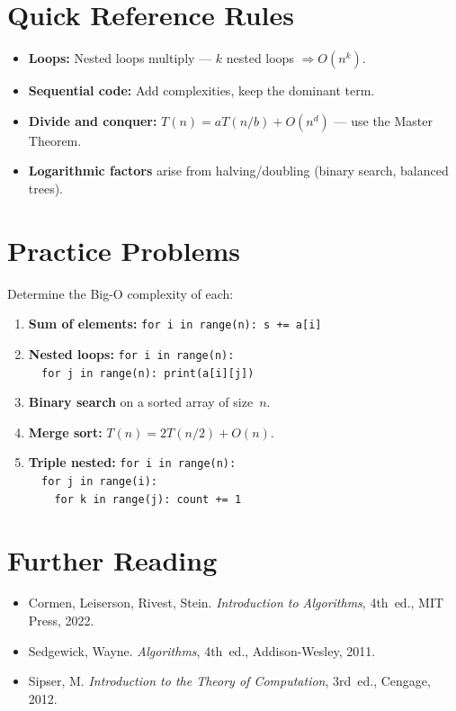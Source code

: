 \documentclass[
    language=english,
    doctype=handout,
    institution=none,
]{../../omnilatex}
\begin{document}

\section{Quick Reference Rules}

\begin{itemize}
    \item \textbf{Loops:} Nested loops multiply --- $k$ nested loops $\Rightarrow O(n^k)$.
    \item \textbf{Sequential code:} Add complexities, keep the dominant term.
    \item \textbf{Divide and conquer:} $T(n) = aT(n/b) + O(n^d)$ --- use the Master Theorem.
    \item \textbf{Logarithmic factors} arise from halving/doubling (binary search, balanced trees).
\end{itemize}

\section{Practice Problems}

Determine the Big-O complexity of each:

\begin{enumerate}
    \item \textbf{Sum of elements:}
          \texttt{for i in range(n): s += a[i]}
    \item \textbf{Nested loops:}
          \texttt{for i in range(n):}\\
          \texttt{\ \ for j in range(n): print(a[i][j])}
    \item \textbf{Binary search} on a sorted array of size~$n$.
    \item \textbf{Merge sort:}
          $T(n) = 2T(n/2) + O(n)$.
    \item \textbf{Triple nested:}
          \texttt{for i in range(n):}\\
          \texttt{\ \ for j in range(i):}\\
          \texttt{\ \ \ \ for k in range(j): count += 1}
\end{enumerate}

\section{Further Reading}

\begin{itemize}
    \item Cormen, Leiserson, Rivest, Stein.
          \textit{Introduction to Algorithms}, 4th~ed., MIT Press, 2022.
    \item Sedgewick, Wayne.
          \textit{Algorithms}, 4th~ed., Addison-Wesley, 2011.
    \item Sipser, M.
          \textit{Introduction to the Theory of Computation}, 3rd~ed.,
          Cengage, 2012.
\end{itemize}
\end{document}
